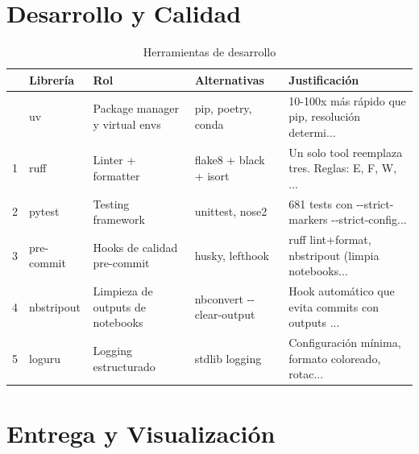 \documentclass[
  spanish,
  11pt,
  letterpaper,
]{scrbook}
\theoremstyle{plain}
\theoremstyle{remark}
\begin{document}
\section{Desarrollo y Calidad}\label{desarrollo-y-calidad}

{

\begin{longtable}[]{@{}lllll@{}}

\caption{\label{tbl-dev-stack}Herramientas de desarrollo}

\tabularnewline

\toprule\noalign{}
& Librería & Rol & Alternativas & Justificación \\
\midrule\noalign{}
\endhead
\bottomrule\noalign{}
\endlastfoot
0 & uv & Package manager y virtual envs & pip, poetry, conda & 10-100x
más rápido que pip, resolución determi... \\
1 & ruff & Linter + formatter & flake8 + black + isort & Un solo tool
reemplaza tres. Reglas: E, F, W, ... \\
2 & pytest & Testing framework & unittest, nose2 & 681 tests con
-\/-strict-markers -\/-strict-config... \\
3 & pre-commit & Hooks de calidad pre-commit & husky, lefthook & ruff
lint+format, nbstripout (limpia notebooks... \\
4 & nbstripout & Limpieza de outputs de notebooks & nbconvert
-\/-clear-output & Hook automático que evita commits con outputs ... \\
5 & loguru & Logging estructurado & stdlib logging & Configuración
mínima, formato coloreado, rotac... \\

\end{longtable}

}

\section{Entrega y Visualización}\label{entrega-y-visualizaciuxf3n}
\end{document}
